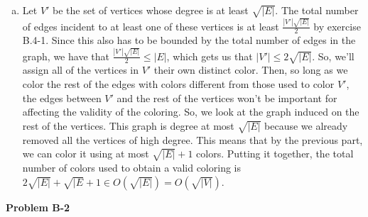 \documentclass{article}
\begin{document}
\begin{enumerate}[a.]
\item
Let $V'$ be the set of vertices whose degree is at least $\sqrt{|E|}$. The total number of edges incident to at least one of these vertices is at least $\frac{|V'|\sqrt{|E|}}{2}$ by exercise B.4-1. Since this also has to be bounded by the total number of edges in the graph, we have that $\frac{|V'|\sqrt{|E|}}{2} \le |E|$, which gets us that $|V'| \le 2\sqrt{|E|}$. So, we'll assign all of the vertices in $V'$ their own distinct color. Then, so long as we color the rest of the edges with colors different from those used to color $V'$, the edges between $V'$ and the rest of the vertices won't be important for affecting the validity of the coloring. So, we look at the graph induced on the rest of the vertices. This graph is degree at most $\sqrt{|E|}$ because we already removed all the vertices of high degree. This means that by the previous part, we can color it using at most $\sqrt{|E|} +1$ colors. Putting it together, the total number of colors used to obtain a valid coloring is $2 \sqrt{|E|} + \sqrt{|E} +1 \in O(\sqrt{|E|}) = O(\sqrt{|V|})$.
\end{enumerate}

\noindent\textbf{Problem B-2}\\
\end{document}
